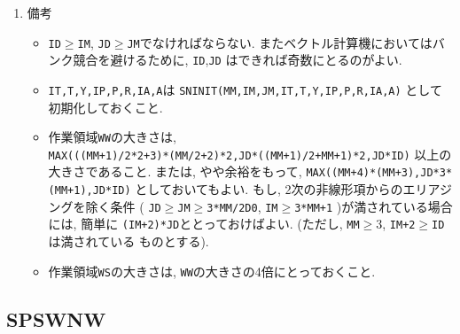 \documentclass[a4j,fleqn]{jarticle}
\begin{document}
\begin{enumerate}
\item 備考

\begin{itemize}

\item {\tt ID}$\ge${\tt IM}, {\tt JD}$\ge${\tt JM}でなければならない.
   またベクトル計算機においてはバンク競合を避けるために, {\tt ID},{\tt JD}
   はできれば奇数にとるのがよい.

\item {\tt IT,T,Y,IP,P,R,IA,A}は 
      {\tt SNINIT(MM,IM,JM,IT,T,Y,IP,P,R,IA,A)} として初期化しておくこと.\\

\item 作業領域{\tt WW}の大きさは,\\
     {\tt MAX(((MM+1)/2*2+3)*(MM/2+2)*2,JD*((MM+1)/2+MM+1)*2,JD*ID)}
    以上の大きさであること. または, やや余裕をもって,
     {\tt MAX((MM+4)*(MM+3),JD*3*(MM+1),JD*ID)}
    としておいてもよい. もし, 2次の非線形項からのエリアジングを除く条件
     ( {\tt JD}$\ge${\tt JM}$\ge${\tt 3*MM/2D0}, 
      {\tt IM}$\ge${\tt 3*MM+1} )が満されている場合には, 簡単に
      {\tt (IM+2)*JD}ととっておけばよい.
     (ただし, {\tt MM}$\ge 3$, {\tt IM+2}$\ge${\tt ID}は満されている
    ものとする).
    
\item 作業領域{\tt WS}の大きさは, {\tt WW}の大きさの4倍にとっておくこと.    

 \end{itemize}

\end{enumerate}


\subsection{SPSWNW}
\end{document}
